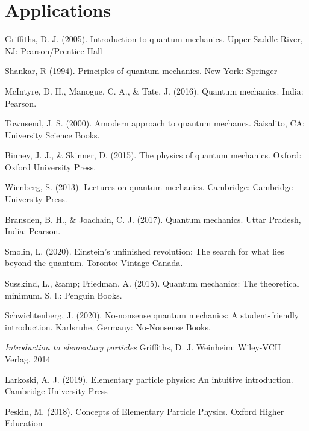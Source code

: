 \documentclass[a4paper,12pt]{book}
\begin{document}
\part{Applications}








%
%
\backmatter
\begin{thebibliography}{9}
	
	 Griffiths, D. J. (2005). Introduction to quantum mechanics. Upper Saddle River, NJ: Pearson/Prentice Hall 
	
	 Shankar, R (1994). Principles of quantum mechanics. New York: Springer
	
	 McIntyre, D. H., Manogue, C. A., \& Tate, J. (2016). Quantum mechanics. India: Pearson.
	
	 Townsend, J. S. (2000). Amodern approach to quantum mechancs. Saisalito, CA: University Science Books.
	
	  Binney, J. J., \& Skinner, D. (2015). The physics of quantum mechanics. Oxford: Oxford University Press.
	
	 Wienberg, S. (2013). Lectures on quantum mechanics. Cambridge: Cambridge University Press.
	
	  Bransden, B. H., \& Joachain, C. J. (2017). Quantum mechanics. Uttar Pradesh, India: Pearson.
	
	 Smolin, L. (2020). Einstein's unfinished revolution: The search for what lies beyond the quantum. Toronto: Vintage Canada.
	
	 Susskind, L., \&amp; Friedman, A. (2015). Quantum mechanics: The theoretical minimum. S. l.: Penguin Books.
	
	 Schwichtenberg, J. (2020). No-nonsense quantum mechanics: A student-friendly introduction. Karlsruhe, Germany: No-Nonsense Books.
	
	 \emph{Introduction to elementary particles}
	\newblock Griffiths, D. J.
	\newblock Weinheim: Wiley-VCH Verlag, 2014
	
	 Larkoski, A. J. (2019). Elementary particle physics: An intuitive introduction. Cambridge University Press 
	
	 Peskin, M. (2018). Concepts of Elementary Particle Physics. Oxford Higher Education 
	

\end{thebibliography}
\end{document}
